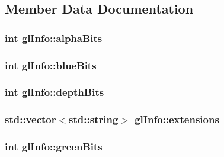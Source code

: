 \subsection{Member Data Documentation}
\hypertarget{structglInfo_ac1f6ab1145051cb46ecf0716c0d5a453}{
\subsubsection[{alpha\-Bits}]{\setlength{\rightskip}{0pt plus 5cm}int gl\-Info\-::alpha\-Bits}}\label{structglInfo_ac1f6ab1145051cb46ecf0716c0d5a453}
\hypertarget{structglInfo_ab297321b61208d90c5e929a39462f7f2}{
\subsubsection[{blue\-Bits}]{\setlength{\rightskip}{0pt plus 5cm}int gl\-Info\-::blue\-Bits}}\label{structglInfo_ab297321b61208d90c5e929a39462f7f2}
\hypertarget{structglInfo_a7c10c7ae71e40d05e16dd29d5402505e}{
\subsubsection[{depth\-Bits}]{\setlength{\rightskip}{0pt plus 5cm}int gl\-Info\-::depth\-Bits}}\label{structglInfo_a7c10c7ae71e40d05e16dd29d5402505e}
\hypertarget{structglInfo_acf0baeef3c59256b5421e7f3a02f5e89}{
\subsubsection[{extensions}]{\setlength{\rightskip}{0pt plus 5cm}std\-::vector$<$std\-::string$>$ gl\-Info\-::extensions}}\label{structglInfo_acf0baeef3c59256b5421e7f3a02f5e89}
\hypertarget{structglInfo_aac9180e543cb14496c2ee225268e4d70}{
\subsubsection[{green\-Bits}]{\setlength{\rightskip}{0pt plus 5cm}int gl\-Info\-::green\-Bits}}\label{structglInfo_aac9180e543cb14496c2ee225268e4d70}
